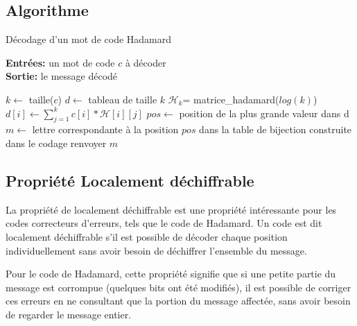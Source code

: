 \documentclass{article}
\begin{document}
\subsection{Algorithme}
\vspace{1em}
\begin{algorithm}[h]
\caption{Décodage d'un mot de code Hadamard}
	\textbf{Entrées:} un mot de code $c$ à décoder\\
    \textbf{Sortie:} le message décodé 
	\begin{algorithmic}
		\State $k \gets $ taille($c$)
		\State $d \gets $ tableau de taille $k$
		\State $\mathcal{H}_{k} $= matrice\_hadamard($log(k)$)
			\State $d[i] \gets \sum_{j=1}^{k} c[i] * \mathcal{H}[i][j]$
		\EndFor
		\State $pos \gets $ position de la plus grande valeur dans d
		\State $m \gets $ lettre correspondante à la position $pos$ dans la table de 
		bijection construite dans le codage 
		\State renvoyer $m$
	\end{algorithmic}
\end{algorithm}
\vspace{1em}

\subsection{Propriété Localement déchiffrable}
La propriété de localement déchiffrable est une propriété intéressante pour les codes 
correcteurs d'erreurs, tels que le code de Hadamard. Un code est dit localement 
déchiffrable s'il est possible de décoder chaque position individuellement sans avoir 
besoin de déchiffrer l'ensemble du message.

Pour le code de Hadamard, cette propriété signifie que si une petite partie du message est
corrompue (quelques bits ont été modifiés), il est possible de corriger ces erreurs en ne 
consultant que la portion du message affectée, sans avoir besoin de regarder le message 
entier.
\newpage
\end{document}
